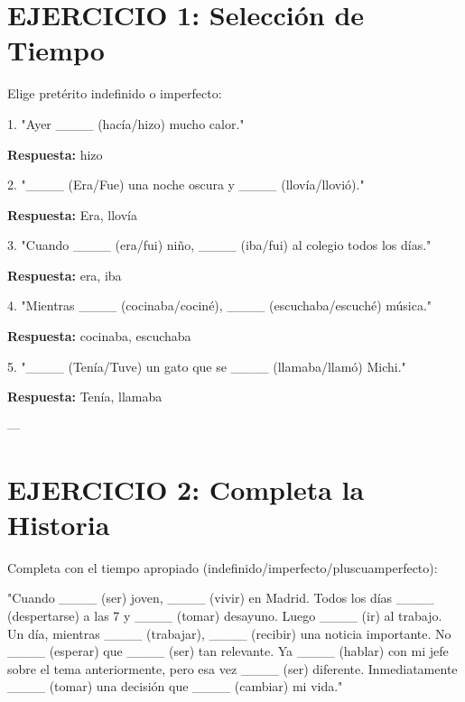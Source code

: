 \documentclass[a4paper,11pt]{article}
\begin{document}
\section{EJERCICIO 1: Selección de Tiempo}

\vspace{0.2cm}

Elige pretérito indefinido o imperfecto:

\vspace{0.2cm}

1. "Ayer ____ (hacía/hizo) mucho calor."

\textbf{Respuesta:} hizo

\vspace{0.2cm}

2. "____ (Era/Fue) una noche oscura y ____ (llovía/llovió)."

\textbf{Respuesta:} Era, llovía

\vspace{0.2cm}

3. "Cuando ____ (era/fui) niño, ____ (iba/fui) al colegio todos los días."

\textbf{Respuesta:} era, iba

\vspace{0.2cm}

4. "Mientras ____ (cocinaba/cociné), ____ (escuchaba/escuché) música."

\textbf{Respuesta:} cocinaba, escuchaba

\vspace{0.2cm}

5. "____ (Tenía/Tuve) un gato que se ____ (llamaba/llamó) Michi."

\textbf{Respuesta:} Tenía, llamaba

\vspace{0.2cm}

---

\vspace{0.2cm}

\section{EJERCICIO 2: Completa la Historia}

\vspace{0.2cm}

Completa con el tiempo apropiado (indefinido/imperfecto/pluscuamperfecto):

\vspace{0.2cm}

"Cuando ____ (ser) joven, ____ (vivir) en Madrid. Todos los días ____ (despertarse) a las 7 y ____ (tomar) desayuno. Luego ____ (ir) al trabajo. Un día, mientras ____ (trabajar), ____ (recibir) una noticia importante. No ____ (esperar) que ____ (ser) tan relevante. Ya ____ (hablar) con mi jefe sobre el tema anteriormente, pero esa vez ____ (ser) diferente. Inmediatamente ____ (tomar) una decisión que ____ (cambiar) mi vida."
\end{document}

